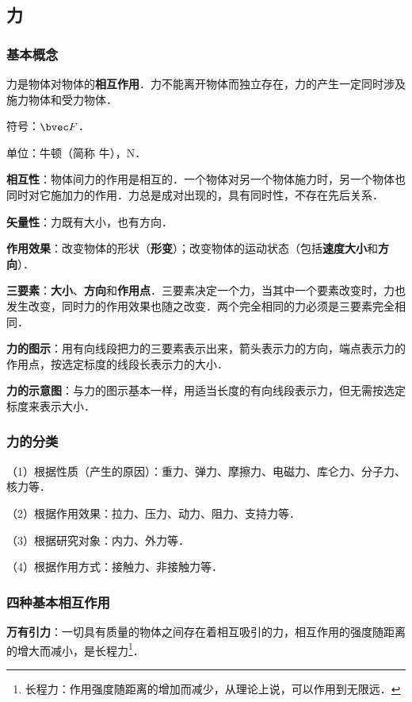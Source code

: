 
\begin{issues}
\issueDraft
\issueTODO
\end{issues}

\subsection{力}
\subsubsection{基本概念}
力是物体对物体的\textbf{相互作用}．力不能离开物体而独立存在，力的产生一定同时涉及施力物体和受力物体．

符号：$\bvec F$．

单位：牛顿（简称 牛），$\mathrm N$．

\textbf{相互性}：物体间力的作用是相互的．一个物体对另一个物体施力时，另一个物体也同时对它施加力的作用．力总是成对出现的，具有同时性，不存在先后关系．

\textbf{矢量性}：力既有大小，也有方向．

\textbf{作用效果}：改变物体的形状（\textbf{形变}）；改变物体的运动状态（包括\textbf{速度大小}和\textbf{方向}）．

\textbf{三要素}：\textbf{大小}、\textbf{方向}和\textbf{作用点}．三要素决定一个力，当其中一个要素改变时，力也发生改变，同时力的作用效果也随之改变．两个完全相同的力必须是三要素完全相同．

\textbf{力的图示}：用有向线段把力的三要素表示出来，箭头表示力的方向，端点表示力的作用点，按选定标度的线段长表示力的大小．

\textbf{力的示意图}：与力的图示基本一样，用适当长度的有向线段表示力，但无需按选定标度来表示大小．

\subsubsection{力的分类}
（1）根据性质（产生的原因）：重力、弹力、摩擦力、电磁力、库仑力、分子力、核力等．

（2）根据作用效果：拉力、压力、动力、阻力、支持力等．

（3）根据研究对象：内力、外力等．

（4）根据作用方式：接触力、非接触力等．

\subsubsection{四种基本相互作用}
\textbf{万有引力}：一切具有质量的物体之间存在着相互吸引的力，相互作用的强度随距离的增大而减小，是长程力\footnote{长程力：作用强度随距离的增加而减少，从理论上说，可以作用到无限远．}．

